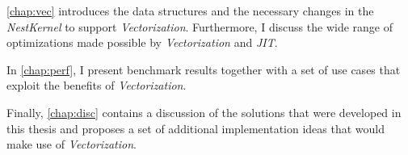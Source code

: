 \autoref{chap:vec} introduces the data structures and the necessary changes in the \emph{NestKernel} to support \emph{Vectorization}. Furthermore, I discuss the wide range of optimizations made possible by \emph{Vectorization} and \emph{JIT}.

In \autoref{chap:perf}, I present benchmark results together with a set of use cases that exploit the benefits of \emph{Vectorization}.

Finally, \autoref{chap:disc} contains a discussion of the solutions that were developed in this thesis and proposes a set of additional implementation ideas that would make use of \emph{Vectorization}.

\cleardoublepage
